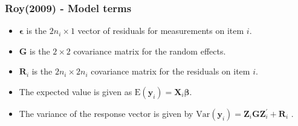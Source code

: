 \documentclass[compress]{beamer}        %
\begin{document}
\begin{frame}
\frametitle{Roy(2009) -  Model terms}
\begin{itemize}\itemsep0.4cm
\item $\boldsymbol{\epsilon}$  is the $2n_i \times  1$ vector of residuals for measurements on item $i$.
\item $\boldsymbol{G}$ is the $2 \times  2$ covariance matrix for the random effects.
\item $\boldsymbol{R}_i$ is the $2n_i \times  2n_i$ covariance matrix for the residuals on item $i$.
\item The expected value is given as $\mbox{E}(\boldsymbol{y}_i) = \boldsymbol{X}_i\boldsymbol{\beta}.$ 
\item The variance of the response vector is given by $\mbox{Var}(\boldsymbol{y}_i)  = \boldsymbol{Z}_i \boldsymbol{G} \boldsymbol{Z}_i^{\prime} + \boldsymbol{R}_i$ . 
\end{itemize}
\end{frame}


\end{document}
